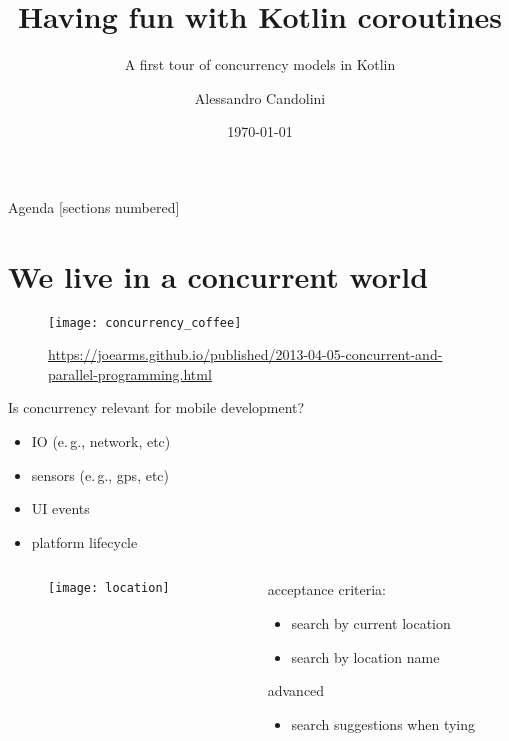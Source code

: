 \documentclass[10pt]{beamer}
\title{Having fun with Kotlin coroutines}
\subtitle{A first tour of concurrency models in Kotlin}
\date{\today}
\author[A. Candolini]{Alessandro Candolini}
\providecommand{\eg}{e.\,g.}
\begin{document}
\maketitle

\begin{frame}{Agenda}
  [sections numbered]
  \tableofcontents[hideallsubsections]
\end{frame}

\section{We live in a concurrent world}
\begin{frame}[fragile]
	\begin{figure}
		\centering
		\texttt{[image: concurrency\_coffee]}
		\caption{\url{https://joearms.github.io/published/2013-04-05-concurrent-and-parallel-programming.html}}
	\end{figure}
\end{frame}
\begin{frame}[fragile]
Is concurrency relevant for mobile development?
	\begin{itemize} 
		\item<2-> IO (\eg, network, etc) 
		\item<3-> sensors (\eg, gps, etc) 
		\item<4-> UI events 
		\item<5-> platform lifecycle 
	\end{itemize}
\end{frame}
\begin{frame}[fragile]
\begin{columns}
\begin{column}{0.4\textwidth}
	\begin{center}
	\begin{figure}
		\centering
		\texttt{[image: location]}
	\end{figure}
	\end{center}
\end{column}
\begin{column}{0.6\textwidth}
	acceptance criteria:
	\begin{itemize}
		\item search by current location 
		\item search by location name 
	\end{itemize}
	advanced 
	\begin{itemize}
		\item search suggestions when tying 
	\end{itemize}
\end{column}
\end{columns}
\end{frame}
\end{document}
